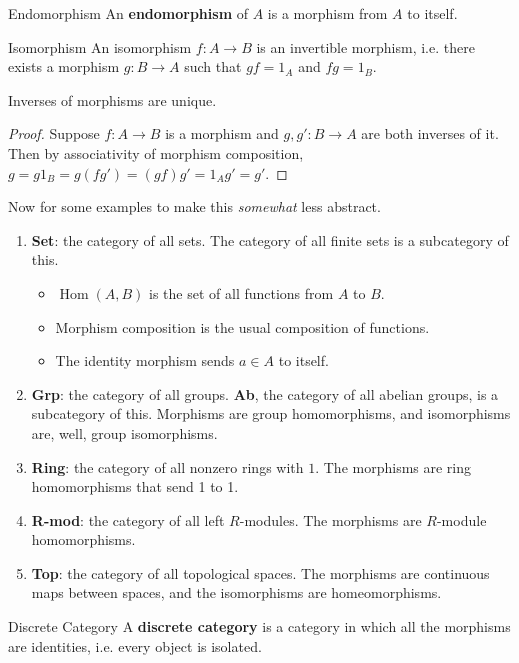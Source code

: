 \documentclass[10pt]{report}
\DeclareMathOperator{\hh}{Hom}
\begin{document}
\begin{defn}{Endomorphism}{}
An \textbf{endomorphism} of $A$ is a morphism from $A$ to itself.
\end{defn}

\begin{defn}{Isomorphism}{}
An isomorphism $f:A\to B$ is an invertible morphism, i.e. there exists a morphism $g:B\to A$ such that $gf=1_{A}$ and $fg=1_{B}$.
\end{defn}

\begin{prop}
Inverses of morphisms are unique.
\end{prop}
\begin{proof}
Suppose $f:A \to B$ is a morphism and $g,g': B \to A$ are both inverses of it. Then by associativity of morphism composition, $g=g1_{B}=g(fg')=(gf)g'=1_{A}g'=g'.$
\end{proof}

Now for some examples to make this \textit{somewhat} less abstract.

\begin{enumerate}
	\item \textbf{Set}: the category of all sets. The category of all finite sets is a subcategory of this.
		\begin{itemize}
			\item $\hh(A,B)$ is the set of all functions from $A$ to $B$.
			\item Morphism composition is the usual composition of functions.
			\item The identity morphism sends $a \in A$ to itself.
		\end{itemize}
	\item \textbf{Grp}: the category of all groups. \textbf{Ab}, the category of all abelian groups, is a subcategory of this. Morphisms are group homomorphisms, and isomorphisms are, well, group isomorphisms.
	\item \textbf{Ring}: the category of all nonzero rings with $1$. The morphisms are ring homomorphisms that send 1 to 1.
	\item \textbf{R-mod}: the category of all left $R$-modules. The morphisms are $R$-module homomorphisms.
	\item \textbf{Top}: the category of all topological spaces. The morphisms are continuous maps between spaces, and the isomorphisms are homeomorphisms.
\end{enumerate}

\begin{defn}{Discrete Category}{}
A \textbf{discrete category} is a category in which all the morphisms are identities, i.e. every object is isolated.
\end{defn}
\end{document}

